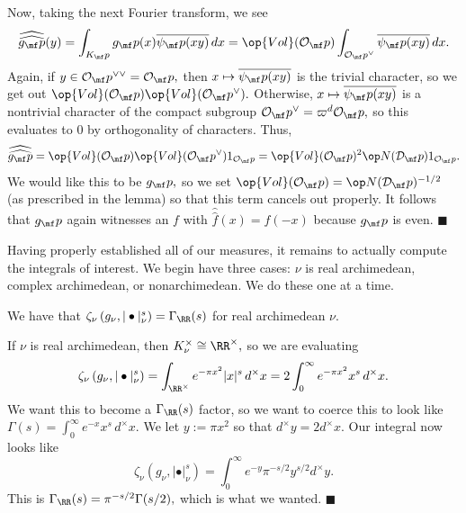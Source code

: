 Now, taking the next Fourier transform, we see
\[\widehat{\widehat{g_\mf p}}(y)=\int_{K_\mf p}g_\mf p(x)\overline{\psi_\mf p(xy)}\,dx=\op{Vol}(\mathcal O_\mf p)\int_{\mathcal O_\mf p^\vee}\overline{\psi_\mf p(xy)}\,dx.\]
Again, if $y\in\mathcal O_\mf p^{\vee\vee}=\mathcal O_\mf p,$ then $x\mapsto\overline{\psi_\mf p(xy)}$ is the trivial character, so we get out $\op{Vol}(\mathcal O_\mf p)\op{Vol}(\mathcal O_\mf p^\vee).$ Otherwise, $x\mapsto\overline{\psi_\mf p(xy)}$ is a nontrivial character of the compact subgroup $\mathcal O_\mf p^\vee=\varpi^d\mathcal O_\mf p,$ so this evaluates to $0$ by orthogonality of characters. Thus,
\[\widehat{\widehat{g_\mf p}}=\op{Vol}(\mathcal O_\mf p)\op{Vol}(\mathcal O_\mf p^\vee)1_{\mathcal O_\mf p}=\op{Vol}(\mathcal O_\mf p)^2\op N(\mathcal D_\mf p)1_{\mathcal O_\mf p}.\]
We would like this to be $g_\mf p,$ so we set $\op{Vol}(\mathcal O_\mf p)=\op N(\mathcal D_\mf p)^{-1/2}$ (as prescribed in the lemma) so that this term cancels out properly. It follows that $g_\mf p$ again witnesses an $f$ with $\hat{\hat f}(x)=f(-x)$ because $g_\mf p$ is even. $\blacksquare$

Having properly established all of our measures, it remains to actually compute the integrals of interest. We begin have three cases: $\nu$ is real archimedean, complex archimedean, or nonarchimedean. We do these one at a time.
\begin{lemma}
    We have that $\zeta_\nu\left(g_\nu,|\bullet|_\nu^s\right)=\Gamma_\RR(s)$ for real archimedean $\nu.$
\end{lemma}
If $\nu$ is real archimedean, then $K_\nu^\times\cong\RR^\times,$ so we are evaluating
\[\zeta_\nu\left(g_\nu,|\bullet|_\nu^s\right)=\int_{\RR^\times}e^{-\pi x^2}|x|^s\,d^\times x=2\int_0^\infty e^{-\pi x^2}x^s\,d^\times x.\]
We want this to become a $\Gamma_\RR(s)$ factor, so we want to coerce this to look like $\Gamma(s)=\int_0^\infty e^{-x}x^s\,d^\times x.$ We let $y:=\pi x^2$ so that $d^\times y=2d^\times x.$ Our integral now looks like
\[\zeta_\nu\left(g_\nu,|\bullet|_\nu^s\right)=\int_0^\infty e^{-y}\pi^{-s/2}y^{s/2} d^\times y.\]
This is $\Gamma_\RR(s)=\pi^{-s/2}\Gamma(s/2),$ which is what we wanted. $\blacksquare$

